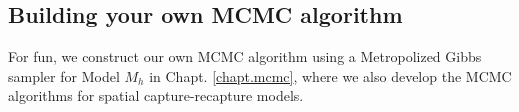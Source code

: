 \subsection{Building your own MCMC algorithm}

For fun, we construct our own MCMC algorithm using a Metropolized
Gibbs sampler for Model $M_{h}$ in Chapt. \ref{chapt.mcmc}, where we
also develop the MCMC 
algorithms for spatial capture-recapture models.

